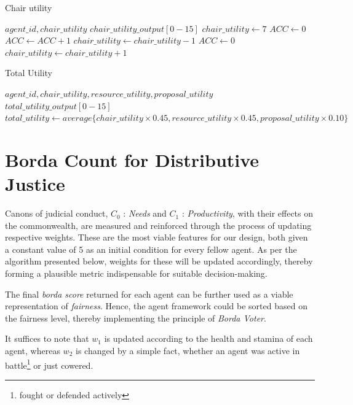 \begin{algorithm}
\caption{Chair utility}
\begin{algorithmic} 
\Require $agent\_id, chair\_utility$
\Ensure $chair\_utility\_output[0-15]$
\State $chair\_utility \leftarrow 7$
\State $ACC \leftarrow 0$
\EndIf
{}
\State $ACC \leftarrow ACC+1$
\State $chair\_utility \leftarrow chair\_utility - 1$
\State $ACC \leftarrow 0$
\EndIf
\EndIf
{}
\State $chair\_utility \leftarrow chair\_utility + 1$
\EndIf
\EndIf
\end{algorithmic}
\end{algorithm}

\begin{algorithm}
\caption{Total Utility}
\begin{algorithmic} 
\Require $agent\_id, chair\_utility, resource\_utility, proposal\_utility$
\Ensure $total\_utility\_output[0-15]$
\State $total\_utility \leftarrow average\{chair\_utility \times 0.45, resource\_utility \times 0.45, proposal\_utility \times 0.10\}$
\EndIf
\end{algorithmic}
\end{algorithm}


\clearpage
\section{Borda Count for Distributive Justice }

Canons of judicial conduct, $C_0$ : \textit{Needs} and $C_1$ : \textit{Productivity}, with their effects on the commonwealth, are measured and reinforced through the process of updating respective weights. These are the most viable features for our design, both given a constant value of 5 as an initial condition for every fellow agent. As per the algorithm presented below, weights for these will be updated accordingly, thereby forming a plausible metric indispensable for suitable decision-making.

The final \textit{borda score} returned for each agent can be further used as a viable representation of \textit{fairness}. Hence, the agent framework could be sorted based on the fairness level, thereby implementing the principle of \textit{Borda Voter}.

It suffices to note that $w_1$ is updated according to the health and stamina of each agent, whereas $w_2$ is changed by a simple fact, whether an agent was active in battle\footnote{fought or defended actively} or just cowered.

